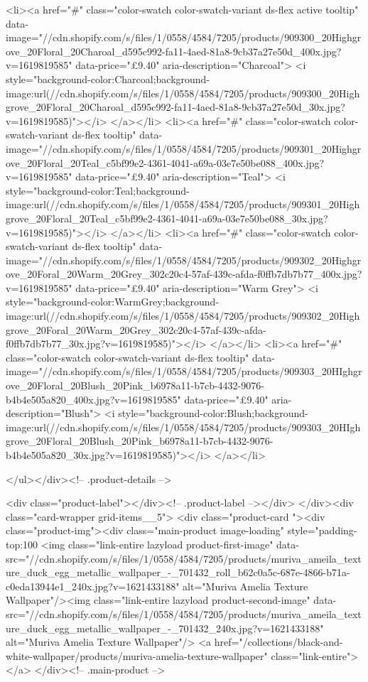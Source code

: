 {{{{{{{<li><a href="#" class="color-swatch color-swatch-variant ds-flex active tooltip" data-image="//cdn.shopify.com/s/files/1/0558/4584/7205/products/909300_20Highgrove_20Floral_20Charoal_d595c992-fa11-4aed-81a8-9cb37a27e50d_400x.jpg?v=1619819585" data-price="£9.40" aria-description="Charcoal">
              <i style="background-color:Charcoal;background-image:url(//cdn.shopify.com/s/files/1/0558/4584/7205/products/909300_20Highgrove_20Floral_20Charoal_d595c992-fa11-4aed-81a8-9cb37a27e50d_30x.jpg?v=1619819585)"></i>
            </a></li>
<li><a href="#" class="color-swatch color-swatch-variant ds-flex tooltip" data-image="//cdn.shopify.com/s/files/1/0558/4584/7205/products/909301_20Highgrove_20Floral_20Teal_c5bf99e2-4361-4041-a69a-03e7e50be088_400x.jpg?v=1619819585" data-price="£9.40" aria-description="Teal">
              <i style="background-color:Teal;background-image:url(//cdn.shopify.com/s/files/1/0558/4584/7205/products/909301_20Highgrove_20Floral_20Teal_c5bf99e2-4361-4041-a69a-03e7e50be088_30x.jpg?v=1619819585)"></i>
            </a></li>
<li><a href="#" class="color-swatch color-swatch-variant ds-flex tooltip" data-image="//cdn.shopify.com/s/files/1/0558/4584/7205/products/909302_20Highgrove_20Foral_20Warm_20Grey_302c20c4-57af-439c-afda-f0ffb7db7b77_400x.jpg?v=1619819585" data-price="£9.40" aria-description="Warm Grey">
              <i style="background-color:WarmGrey;background-image:url(//cdn.shopify.com/s/files/1/0558/4584/7205/products/909302_20Highgrove_20Foral_20Warm_20Grey_302c20c4-57af-439c-afda-f0ffb7db7b77_30x.jpg?v=1619819585)"></i>
            </a></li>
<li><a href="#" class="color-swatch color-swatch-variant ds-flex tooltip" data-image="//cdn.shopify.com/s/files/1/0558/4584/7205/products/909303_20HIghgrove_20Floral_20Blush_20Pink_b6978a11-b7cb-4432-9076-b4b4e505a820_400x.jpg?v=1619819585" data-price="£9.40" aria-description="Blush">
              <i style="background-color:Blush;background-image:url(//cdn.shopify.com/s/files/1/0558/4584/7205/products/909303_20HIghgrove_20Floral_20Blush_20Pink_b6978a11-b7cb-4432-9076-b4b4e505a820_30x.jpg?v=1619819585)"></i>
            </a></li>

      </ul></div><!-- .product-details -->

<div class="product-label"></div><!-- .product-label --></div>
          </div><div class="card-wrapper grid-items__5">
            <div class="product-card "><div class="product-img"><div class="main-product image-loading" style="padding-top:100%
      <img class="link-entire lazyload product-first-image" data-src="//cdn.shopify.com/s/files/1/0558/4584/7205/products/muriva_ameila_texture_duck_egg_metallic_wallpaper_-_701432_roll_b62c0a5c-687e-4866-b71a-c0eda13944e1_240x.jpg?v=1621433188" alt="Muriva Amelia Texture Wallpaper"/><img class="link-entire lazyload product-second-image" data-src="//cdn.shopify.com/s/files/1/0558/4584/7205/products/muriva_ameila_texture_duck_egg_metallic_wallpaper_-_701432_240x.jpg?v=1621433188" alt="Muriva Amelia Texture Wallpaper"/>
      <a href="/collections/black-and-white-wallpaper/products/muriva-amelia-texture-wallpaper" class="link-entire"></a>
    </div><!-- .main-product -->
  
}}}}}}}
